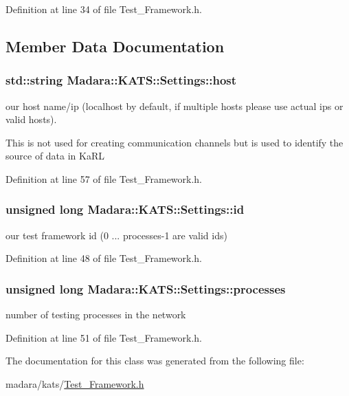 Definition at line 34 of file Test\_\-Framework.h.



\subsection{Member Data Documentation}
\hypertarget{classMadara_1_1KATS_1_1Settings_a391b9c09b7472ae8f2296dca0c46867d}{
\subsubsection[{host}]{\setlength{\rightskip}{0pt plus 5cm}std::string {\bf Madara::KATS::Settings::host}}}
\label{d0/ddd/classMadara_1_1KATS_1_1Settings_a391b9c09b7472ae8f2296dca0c46867d}


our host name/ip (localhost by default, if multiple hosts please use actual ips or valid hosts). 

This is not used for creating communication channels but is used to identify the source of data in KaRL 

Definition at line 57 of file Test\_\-Framework.h.

\hypertarget{classMadara_1_1KATS_1_1Settings_a3e27684fad123337ee0213fce807e7fc}{
\subsubsection[{id}]{\setlength{\rightskip}{0pt plus 5cm}unsigned long {\bf Madara::KATS::Settings::id}}}
\label{d0/ddd/classMadara_1_1KATS_1_1Settings_a3e27684fad123337ee0213fce807e7fc}


our test framework id (0 ... processes-\/1 are valid ids) 



Definition at line 48 of file Test\_\-Framework.h.

\hypertarget{classMadara_1_1KATS_1_1Settings_a0866a0372654c0874e5f1eb4e84867d1}{
\subsubsection[{processes}]{\setlength{\rightskip}{0pt plus 5cm}unsigned long {\bf Madara::KATS::Settings::processes}}}
\label{d0/ddd/classMadara_1_1KATS_1_1Settings_a0866a0372654c0874e5f1eb4e84867d1}


number of testing processes in the network 



Definition at line 51 of file Test\_\-Framework.h.



The documentation for this class was generated from the following file:\begin{DoxyCompactItemize}
\item 
madara/kats/\hyperlink{Test__Framework_8h}{Test\_\-Framework.h}\end{DoxyCompactItemize}
